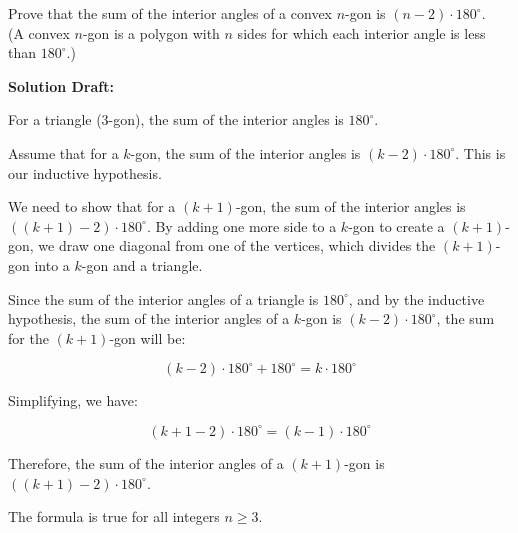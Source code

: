 \documentclass{article}
\begin{document}
Prove that the sum of the interior angles of a convex \(n\)-gon is \((n - 2) \cdot 180^\circ\). \\
(A convex \(n\)-gon is a polygon with \(n\) sides for which each interior angle is less than \(180^\circ\).)


\vspace{0.5cm}
\noindent\textbf{Solution Draft:} 
\vspace{0.2cm}

For a triangle (3-gon), the sum of the interior angles is \(180^\circ\).


Assume that for a \(k\)-gon, the sum of the interior angles is \((k - 2) \cdot 180^\circ\). This is our inductive hypothesis.


We need to show that for a \((k + 1)\)-gon, the sum of the interior angles is \(((k + 1) - 2) \cdot 180^\circ\). By adding one more side to a \(k\)-gon to create a \((k + 1)\)-gon, we draw one diagonal from one of the vertices, which divides the \((k + 1)\)-gon into a \(k\)-gon and a triangle.

Since the sum of the interior angles of a triangle is \(180^\circ\), and by the inductive hypothesis, the sum of the interior angles of a \(k\)-gon is \((k - 2) \cdot 180^\circ\), the sum for the \((k + 1)\)-gon will be:

\[(k - 2) \cdot 180^\circ + 180^\circ = k \cdot 180^\circ\]

Simplifying, we have:

\[(k + 1 - 2) \cdot 180^\circ = (k - 1) \cdot 180^\circ\]

Therefore, the sum of the interior angles of a \((k + 1)\)-gon is \(((k + 1) - 2) \cdot 180^\circ\).

The formula is true for all integers \(n \geq 3\).
\end{document}
